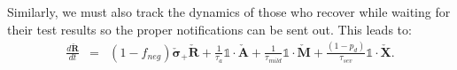 \documentclass[notitlepage, superscriptaddress]{revtex4-2}
\begin{document}
Similarly, we must also track the dynamics of those who recover while waiting for their test results so the proper notifications can be sent out. This leads to:
\begin{eqnarray}
\frac{d \boldsymbol{\check{R}}}{dt} &=& (1-f_{neg}) \boldsymbol{\check{\sigma}_{+}} \boldsymbol{\check{R}} + \frac{1}{\tau_{a}} \mathbb{1} \cdot \boldsymbol{\check{A}} + \frac{1}{\tau_{mild}} \mathbb{1} \cdot \boldsymbol{\check{M}} + \frac{(1-p_{d})}{\tau_{sev}} \mathbb{1} \cdot \boldsymbol{\check{X}}. 
\end{eqnarray}









\end{document}
